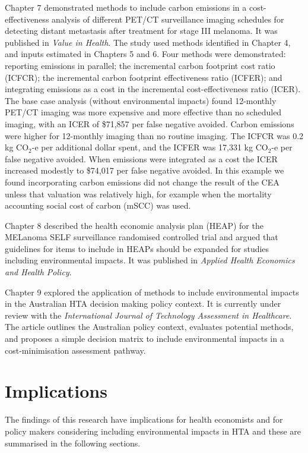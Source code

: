 \begin{refsection}
Chapter 7 demonstrated methods to include carbon emissions in a cost-effectiveness analysis of different PET/CT surveillance imaging schedules for detecting distant metastasis after treatment for stage III melanoma. It was published in \textit{Value in Health}. The study used methods identified in Chapter 4, and inputs estimated in Chapters 5 and 6. Four methods were demonstrated: reporting emissions in parallel; the incremental carbon footprint cost ratio (ICFCR); the incremental carbon footprint effectiveness ratio (ICFER); and integrating emissions as a cost in the incremental cost-effectiveness ratio (ICER). The base case analysis (without environmental impacts) found 12-monthly PET/CT imaging was more expensive and more effective than no scheduled imaging, with an ICER of \$71,857 per false negative avoided. Carbon emissions were higher for 12-monthly imaging than no routine imaging. The ICFCR was 0.2 kg CO$_{2}$-e per additional dollar spent, and the ICFER was 17,331 kg CO$_{2}$-e per false negative avoided. When emissions were integrated as a cost the ICER increased modestly to \$74,017 per false negative avoided. In this example we found incorporating carbon emissions did not change the result of the CEA unless that valuation was relatively high, for example when the mortality accounting social cost of carbon (mSCC) was used. 

Chapter 8 described the health economic analysis plan (HEAP) for the MELanoma SELF surveillance randomised controlled trial and argued that guidelines for items to include in HEAPs should be expanded for studies including environmental impacts. It was published in \textit{Applied Health Economics and Health Policy}. 

Chapter 9 explored the application of methods to include environmental impacts in the Australian HTA decision making policy context. It is currently under review with the \textit{International Journal of Technology Assessment in Healthcare}. The article outlines the Australian policy context, evaluates potential methods, and proposes a simple decision matrix to include environmental impacts in a cost-minimisation assessment pathway.

\section{Implications}
The findings of this research have implications for health economists and for policy makers considering including environmental impacts in HTA and these are summarised in the following sections. 


\end{refsection}
